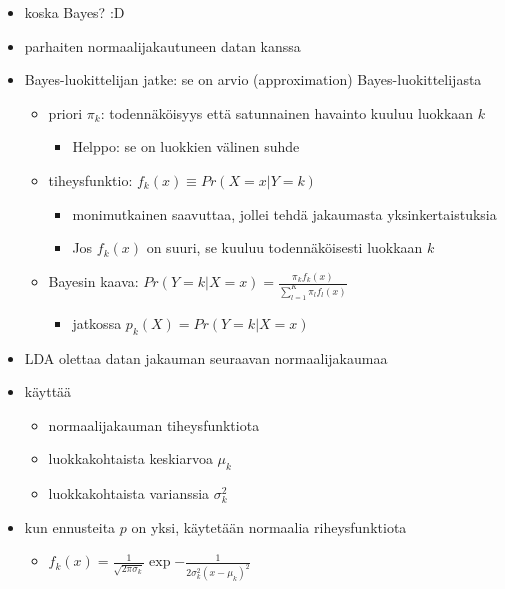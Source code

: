 \begin{itemize}
    \item koska Bayes? :D
    \item parhaiten normaalijakautuneen datan kanssa
    \item Bayes-luokittelijan jatke: se on arvio (approximation) Bayes-luokittelijasta
    \begin{itemize}
        \item priori $\pi_k$: todennäköisyys että satunnainen havainto kuuluu luokkaan $k$
        \begin{itemize}
            \item Helppo: se on luokkien välinen suhde
        \end{itemize}
        \item tiheysfunktio: $f_k(x) \equiv Pr(X = x | Y = k)$
        \begin{itemize}
            \item monimutkainen saavuttaa, jollei tehdä jakaumasta yksinkertaistuksia
        \end{itemize}
        \begin{itemize}
            \item Jos $f_k(x)$ on suuri, se kuuluu todennäköisesti luokkaan $k$
        \end{itemize}
        \item Bayesin kaava: $Pr(Y = k | X = x) = \frac{\pi_k f_k(x)}{\sum^K_{l=1} \pi_l f_l(x)}$
        \begin{itemize}
            \item jatkossa $p_k(X) = Pr(Y = k | X = x)$
        \end{itemize}
    \end{itemize}
    \item LDA olettaa datan jakauman seuraavan normaalijakaumaa
    \item käyttää
    \begin{itemize}
        \item normaalijakauman tiheysfunktiota
        \item luokkakohtaista keskiarvoa $\mu_k$
        \item luokkakohtaista varianssia $\sigma_k^2$
    \end{itemize}
    \item kun ennusteita $p$ on yksi, käytetään normaalia riheysfunktiota
    \begin{itemize}
        \item $f_k(x) = \frac{1}{\sqrt{2 \pi \sigma_k}} \exp{-\frac{1}{2 \sigma^2_k (x - \mu_k)^2}}$

\end{itemize}
\end{itemize}
